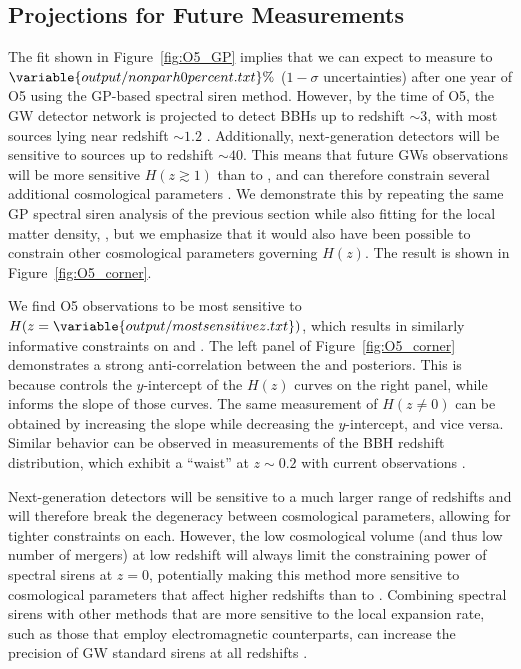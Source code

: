 \documentclass[]{aastex631}
\begin{document}
\subsection{Projections for Future Measurements}
The fit shown in Figure~\ref{fig:O5_GP} implies that we can expect to measure \Ho{} to $\variable{output/nonparh0percent.txt}\%$ ($1-\sigma$ uncertainties) after one year of \ac{O5} using the \ac{GP}-based spectral siren method.
However, by the time of \ac{O5}, the \ac{GW} detector network is projected to detect \acp{BBH} up to redshift $\sim 3$, with most sources lying near redshift $\sim 1.2$ \citep{chen_distance_2021}.
Additionally, next-generation detectors will be sensitive to sources up to redshift $\sim 40$.
This means that future \acp{GW} observations will be more sensitive $H(z\gtrsim1)$ than to \Ho, and can therefore constrain several additional cosmological parameters \citep{Chen:2024gdn}.
We demonstrate this by repeating the same \ac{GP} spectral siren analysis of the previous section while also fitting for the local matter density, \Omm, but we emphasize that it would also have been possible to constrain other cosmological parameters governing $H(z)$.
The result is shown in Figure~\ref{fig:O5_corner}.

We find \ac{O5} observations to be most sensitive to $H(z=\variable{output/mostsensitivez.txt})$, which results in similarly informative constraints on \Omm{} and \Ho.
The left panel of Figure~\ref{fig:O5_corner} demonstrates a strong anti-correlation between the \Omm{} and \Ho{} posteriors. 
This is because \Ho{} controls the $y$-intercept of the $H(z)$ curves on the right panel, while \Omm{} informs the slope of those curves.
The same measurement of $H(z\neq0)$ can be obtained by increasing the slope while decreasing the $y$-intercept, and vice versa.
Similar behavior can be observed in measurements of the \ac{BBH} redshift distribution, which exhibit a ``waist'' at $z\sim0.2$ with current observations \citep{abbott_population_2023, callister_parameter-free_2023}.

Next-generation detectors will be sensitive to a much larger range of redshifts \citep{et_steering_committee_einstein_2020, evans_horizon_2021} and will therefore break the degeneracy between cosmological parameters, allowing for tighter constraints on each.
However, the low cosmological volume (and thus low number of mergers) at low redshift will always limit the constraining power of spectral sirens at $z=0$, potentially making this method more sensitive to cosmological parameters that affect higher redshifts than to \Ho.
Combining spectral sirens with other methods that are more sensitive to the local expansion rate, such as those that employ electromagnetic counterparts, can increase the precision of \ac{GW} standard sirens at all redshifts \citep[e.g.][]{Chen:2024gdn}.
\end{document}
